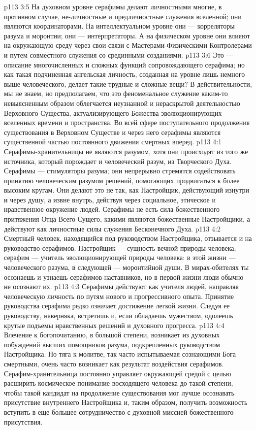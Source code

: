 \vs p113 3:5 На духовном уровне серафимы делают личностными многие, в противном случае, не\hyp{}личностные и предличностные служения вселенной; они являются координаторами. На интеллектуальном уровне они --- корреляторы разума и моронтии; они --- интерпретаторы. А на физическом уровне они влияют на окружающую среду через свои связи с Мастерами\hyp{}Физическими Контролерами и путем совместного служения со срединными созданиями.
\vs p113 3:6 Это --- описание многочисленных и сложных функций сопровождающего серафима; но как такая подчиненная ангельская личность, созданная на уровне лишь немного выше человеческого, делает такие трудные и сложные вещи? В действительности, мы не знаем, но предполагаем, что это феноменальное служение каким\hyp{}то невыясненным образом облегчается неузнанной и нераскрытой деятельностью Верховного Существа, актуализирующего Божества эволюционирующих вселенных времени и пространства. Во всей сфере поступательного продолжения существования в Верховном Существе и через него серафимы являются существенной частью постоянного движения смертных вперед.
\vs p113 4:1 Серафимы\hyp{}хранительницы не являются разумом, хотя они происходят из того же источника, который порождает и человеческий разум, из Творческого Духа. Серафимы --- стимуляторы разума; они непрерывно стремятся содействовать принятию человеческим разумом решений, помогающих продвигаться к более высоким кругам. Они делают это не так, как Настройщик, действующий изнутри и через душу, а извне внутрь, действуя через социальное, этическое и нравственное окружение людей. Серафимы не есть сила божественного притяжения Отца Всего Сущего, какими являются божественные Настройщики, а действуют как личностные силы служения Бесконечного Духа.
\vs p113 4:2 Смертный человек, находящийся под руководством Настройщика, отзывается и на руководство серафимов. Настройщик --- сущность вечной природы человека; серафим --- учитель эволюционирующей природы человека: в этой жизни --- человеческого разума, в следующей --- моронтийной души. В мирах\hyp{}обителях ты осознаешь и узнаешь серафимов\hyp{}наставников, но в первой жизни люди обычно не осознают их.
\vs p113 4:3 Серафимы действуют как учителя людей, направляя человеческую личность по путям нового и прогрессивного опыта. Принятие руководства серафима редко означает достижение легкой жизни. Следуя ее руководству, наверняка, встретишь и, если обладаешь мужеством, одолеешь крутые подъемы нравственных решений и духовного прогресса.
\vs p113 4:4 Влечение к богопочитанию, в большой степени, возникает из духовных побуждений высших помощников разума, подкрепленных руководством Настройщика. Но тяга к молитве, так часто испытываемая сознающими Бога смертными, очень часто возникает как результат воздействия серафимов. Серафим\hyp{}хранительница постоянно управляет окружающей средой с целью расширить космическое понимание восходящего человека до такой степени, чтобы такой кандидат на продолжение существования мог лучше осознавать присутствие внутреннего Настройщика и, таким образом, получить возможность вступить в еще большее сотрудничество с духовной миссией божественного присутствия.
